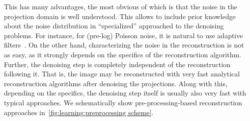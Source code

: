 \documentclass[../ml-ct.tex]{subfiles}
\begin{document}
This has many advantages, the most obvious of which is that the noise in the projection domain is well understood.
This allows to include prior knowledge about the noise distribution in \enquote{specialized} approached to the denoising problems. 
For instance, for (pre-log) Poisson noise, it is natural to use adaptive filters~\cite{hsieh_adaptive_1998,kachelrie_adaptive_2001}.
On the other hand, characterizing the noise in the reconstruction is not as easy, as it strongly depends on the specifics of the reconstruction algorithm.
Further, the denoising step is completely independent of the reconstruction following it.
That is, the image may be reconstructed with very fast analytical reconstruction algorithms after denoising the projections.
Along with this, depending on the specifics, the denoising step itself is usually also very fast with typical approaches.
We schematically show pre-processing-based reconstruction approaches in~\cref{fig:learning:preprocessing scheme}.
\end{document}
